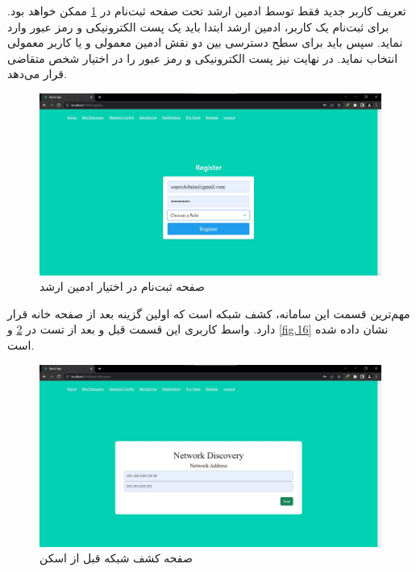 \newpage

تعریف کاربر جدید فقط توسط ادمین ارشد تحت صفحه ثبت‌نام در \cref{fig.14} ممکن خواهد بود. برای ثبت‌نام یک کاربر، ادمین ارشد ابتدا باید یک پست الکترونیکی و رمز عبور وارد نماید. سپس باید برای سطح دسترسی بین دو نقش ادمین معمولی و یا کاربر معمولی انتخاب نماید. در نهایت نیز پست الکترونیکی و رمز عبور را در اختیار شخص متقاضی قرار می‌دهد.


\begin{figure}[!h]
    \centering\includegraphics[scale=.35]{./register}
    \caption{صفحه ثبت‌نام در اختیار ادمین ارشد}\label{fig.14}
\end{figure}

\cleardoublepage

مهم‌ترین قسمت این سامانه، کشف شبکه است که اولین گزینه بعد از صفحه خانه قرار دارد. واسط کاربری این قسمت قبل و بعد از تست در \cref{fig.15} و \cref{fig.16} نشان داده شده‌ است. 


\begin{figure}[!h]
    \centering\includegraphics[scale=.38]{./net-dis-before}
    \caption{صفحه کشف شبکه قبل از اسکن}\label{fig.15}
\end{figure}


